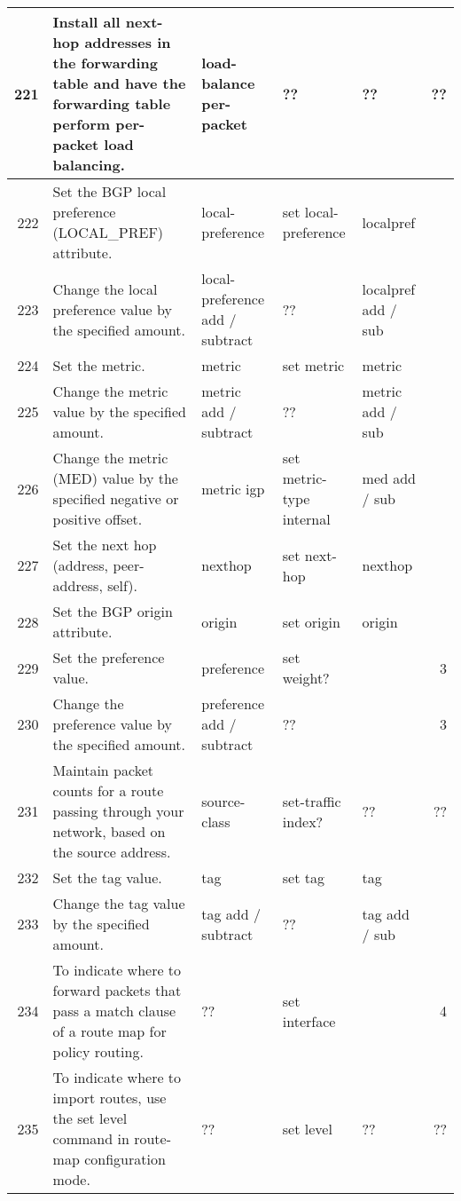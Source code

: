 \documentclass[letterpaper]{article}
\begin{document}
\begin{center}
\begin{supertabular}{|r |p{6cm} |p{2cm} |p{2cm} |p{2cm} |r|}
221 &
Install all next-hop addresses in the forwarding table and have the forwarding
table perform per-packet load balancing.
& load-balance per-packet & ?? & ?? & ?? \\
\hline

222 &
Set the BGP local preference (LOCAL\_PREF) attribute. 
& local-preference & set local-preference & localpref &\\
\hline

223 &
Change the local preference value by the specified amount. 
& local-preference add / subtract & ?? & localpref add / sub &   \\
\hline

224 &
Set the metric.
& metric & set metric & metric &\\
\hline

225 &
Change the metric value by the specified amount. 
& metric add / subtract & ?? & metric add / sub &   \\
\hline

226 &
Change the metric (MED) value by the specified negative or positive offset.
& metric igp & set metric-type internal &  med add / sub &   \\
\hline

227 &
Set the next hop (address, peer-address, self).
& nexthop & set next-hop &  nexthop &   \\
\hline

228 &
Set the BGP origin attribute.
& origin & set origin & origin &\\
\hline

229 &
Set the preference value. 
& preference & set weight? &  & 3 \\
\hline

230 &
Change the preference value by the specified amount. 
& preference add / subtract & ?? &  & 3 \\
\hline

231 &
Maintain packet counts for a route passing through your network, based on the
source address.
& source-class & set-traffic index? & ?? & ?? \\
\hline

232 &
Set the tag value. 
& tag & set tag & tag & \\
\hline

233 &
Change the tag value by the specified amount.
& tag add / subtract & ?? & tag add / sub &   \\
\hline

234 &
To indicate where to forward packets that pass a match clause of a route map for
policy routing.
& ?? & set interface &  & 4 \\
\hline

235 &
To indicate where to import routes, use the set level command in route-map
configuration mode.
& ?? & set level & ?? & ?? \\

\end{supertabular}
\end{center}
\end{document}
